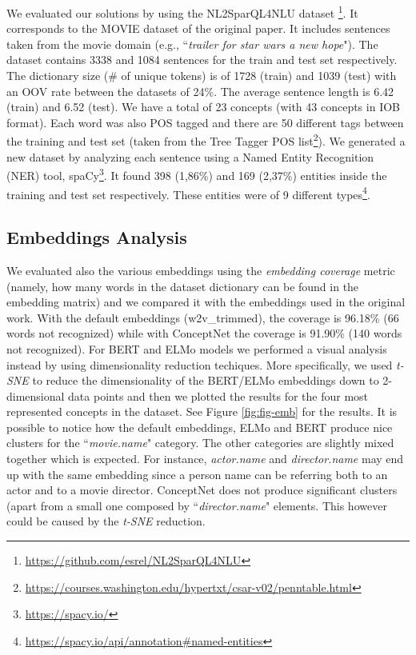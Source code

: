 \documentclass[11pt,a4paper]{article}
\begin{document}
We evaluated our solutions by using the NL2SparQL4NLU dataset \footnote{\url{https://github.com/esrel/NL2SparQL4NLU}}. It corresponds to the MOVIE dataset of the original paper. It includes sentences taken from the movie domain (e.g., ``\textit{trailer for star wars a new hope}"). The dataset contains 3338 and 1084 sentences for the train and test set respectively. The dictionary size (\# of unique tokens) is of 1728 (train) and 1039 (test) with an OOV rate between the datasets of 24\%. The average sentence length is 6.42 (train) and 6.52 (test). We have a total of 23 concepts (with 43 concepts in IOB format). Each word was also POS tagged and there are 50 different tags between the training and test set (taken from the Tree Tagger POS list\footnote{\url{https://courses.washington.edu/hypertxt/csar-v02/penntable.html}}).
We generated a new dataset by analyzing each sentence using a Named Entity Recognition (NER) tool, spaCy\footnote{\url{https://spacy.io/}}. It found 398 (1,86\%)  and 169 (2,37\%) entities inside the training and test set respectively. These entities were of 9 different types\footnote{\url{https://spacy.io/api/annotation\#named-entities}}.

\subsection{Embeddings Analysis}
We evaluated also the various embeddings using the \textit{embedding coverage} metric (namely, how many words in the dataset dictionary can be found in the embedding matrix) and we compared it with the embeddings used in the original work. With the default embeddings (w2v\_trimmed), the coverage is 96.18\% (66 words not recognized) while with ConceptNet the coverage is 91.90\% (140 words not recognized). For BERT and ELMo models we performed a visual analysis instead by using dimensionality reduction techiques. More specifically, we used \textit{t-SNE} \cite{Maaten2008VisualizingDU} to reduce the dimensionality of the BERT/ELMo embeddings down to 2-dimensional data points and then we plotted the results for the four most represented concepts in the dataset. See Figure \ref{fig:fig-emb} for the results. It is possible to notice how the default embeddings, ELMo and BERT produce nice clusters for the ``\textit{movie.name}" category. The other categories are slightly mixed together which is expected. For instance, \textit{actor.name} and \textit{director.name} may end up with the same embedding since a person name can be referring both to an actor and to a movie director. ConceptNet does not produce significant clusters (apart from a small one composed by ``\textit{director.name}" elements. This however could be caused by the \textit{t-SNE} reduction.
\end{document}

